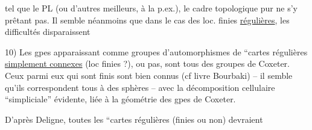 tel que le PL (ou d'autres meilleurs, à la  p.ex.), le cadre topologique pur ne s'y prêtant pas. Il semble néanmoins que dans le cas des  loc. finies \uline{régulières}, les difficultés disparaissent 

10) Les gpes apparaissant comme groupes d'automorphismes de ``cartes régulières  \uline{simplement connexes} (loc finies ?),   ou pas, sont tous des groupes de Coxeter. Ceux parmi eux qui sont finis sont bien connus (cf livre Bourbaki) -- il semble qu'ils correspondent tous à des sphères -- avec la décomposition cellulaire ``simpliciale'' évidente, liée à la géométrie des gpes de Coxeter.

D'après Deligne, toutes les ``cartes régulières (finies ou non)  devraient

